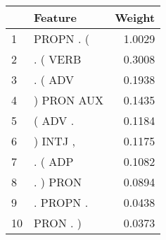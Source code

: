 \begin{tabular}{llr}
\toprule
{} &     Feature &  Weight \\
\midrule
1  &   PROPN . ( &  1.0029 \\
2  &    . ( VERB &  0.3008 \\
3  &     . ( ADV &  0.1938 \\
4  &  ) PRON AUX &  0.1435 \\
5  &     ( ADV . &  0.1184 \\
6  &    ) INTJ , &  0.1175 \\
7  &     . ( ADP &  0.1082 \\
8  &    . ) PRON &  0.0894 \\
9  &   . PROPN . &  0.0438 \\
10 &    PRON . ) &  0.0373 \\
\bottomrule
\end{tabular}
